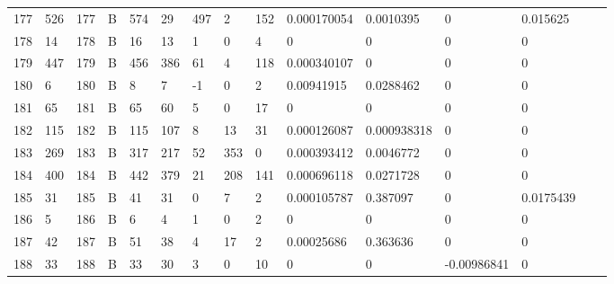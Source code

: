 \begin{longtable}{lllllllllllllll}
	177 & 526               & 177 & B   & 574               & 29                & 497               & 2    & 152        & 0.000170054    & 0.0010395      & 0             & 0.015625     \\
	178 & 14                & 178 & B   & 16                & 13                & 1                 & 0    & 4          & 0              & 0              & 0             & 0            \\
	179 & 447               & 179 & B   & 456               & 386               & 61                & 4    & 118        & 0.000340107    & 0              & 0             & 0            \\
	180 & 6                 & 180 & B   & 8                 & 7                 & -1                & 0    & 2          & 0.00941915     & 0.0288462      & 0             & 0            \\
	181 & 65                & 181 & B   & 65                & 60                & 5                 & 0    & 17         & 0              & 0              & 0             & 0            \\
	182 & 115               & 182 & B   & 115               & 107               & 8                 & 13   & 31         & 0.000126087    & 0.000938318    & 0             & 0            \\
	183 & 269               & 183 & B   & 317               & 217               & 52                & 353  & 0          & 0.000393412    & 0.0046772      & 0             & 0            \\
	184 & 400               & 184 & B   & 442               & 379               & 21                & 208  & 141        & 0.000696118    & 0.0271728      & 0             & 0            \\
	185 & 31                & 185 & B   & 41                & 31                & 0                 & 7    & 2          & 0.000105787    & 0.387097       & 0             & 0.0175439    \\
	186 & 5                 & 186 & B   & 6                 & 4                 & 1                 & 0    & 2          & 0              & 0              & 0             & 0            \\
	187 & 42                & 187 & B   & 51                & 38                & 4                 & 17   & 2          & 0.00025686     & 0.363636       & 0             & 0            \\
	188 & 33                & 188 & B   & 33                & 30                & 3                 & 0    & 10         & 0              & 0              & -0.00986841   & 0            \\

\end{longtable}
